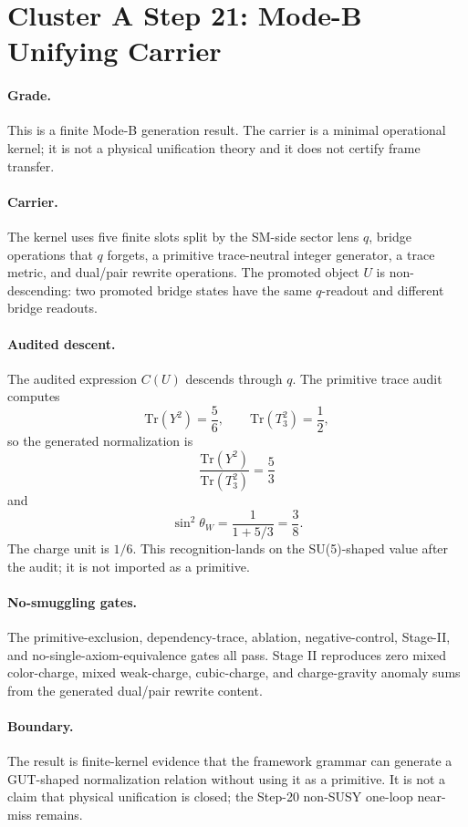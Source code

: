 \section*{Cluster A Step 21: Mode-B Unifying Carrier}

\paragraph{Grade.}
This is a finite Mode-B generation result. The carrier is a minimal operational kernel; it is not a physical unification theory and it does not certify frame transfer.

\paragraph{Carrier.}
The kernel uses five finite slots split by the SM-side sector lens \(q\), bridge operations that \(q\) forgets, a primitive trace-neutral integer generator, a trace metric, and dual/pair rewrite operations. The promoted object \(U\) is non-descending: two promoted bridge states have the same \(q\)-readout and different bridge readouts.

\paragraph{Audited descent.}
The audited expression \(C(U)\) descends through \(q\). The primitive trace audit computes
\[
  \mathrm{Tr}(Y^2)=\frac{5}{6},\qquad
  \mathrm{Tr}(T_3^2)=\frac{1}{2},
\]
so the generated normalization is
\[
  \frac{\mathrm{Tr}(Y^2)}{\mathrm{Tr}(T_3^2)}=\frac{5}{3}
\]
and
\[
  \sin^2\theta_W=\frac{1}{1+5/3}=\frac{3}{8}.
\]
The charge unit is \(1/6\). This recognition-lands on the SU(5)-shaped value after the audit; it is not imported as a primitive.

\paragraph{No-smuggling gates.}
The primitive-exclusion, dependency-trace, ablation, negative-control, Stage-II, and no-single-axiom-equivalence gates all pass. Stage II reproduces zero mixed color-charge, mixed weak-charge, cubic-charge, and charge-gravity anomaly sums from the generated dual/pair rewrite content.

\paragraph{Boundary.}
The result is finite-kernel evidence that the framework grammar can generate a GUT-shaped normalization relation without using it as a primitive. It is not a claim that physical unification is closed; the Step-20 non-SUSY one-loop near-miss remains.
